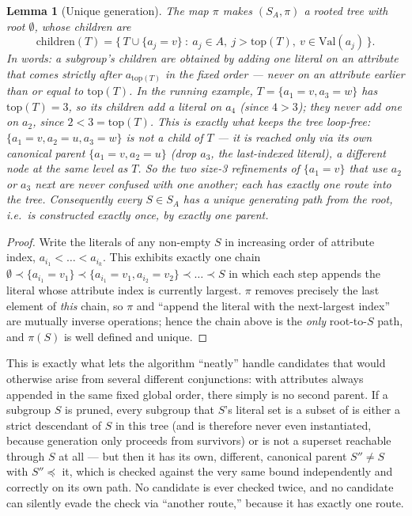 \documentclass[11pt]{article}
\newtheorem{lemma}{Lemma}
\begin{document}
\begin{lemma}[Unique generation]\label{lem:tree}
The map $\pi$ makes $(S_A,\pi)$ a rooted tree with root $\emptyset$, whose children are
\[
\mathrm{children}(T)=\bigl\{\,T\cup\{a_j\!=\!v\}\ :\ a_j\in A,\ j>\mathrm{top}(T),\ v\in\mathrm{Val}(a_j)\,\bigr\}.
\]
In words: a subgroup's children are obtained by adding one literal on an attribute
that comes \emph{strictly after} $a_{\mathrm{top}(T)}$ in the fixed order — never on
an attribute earlier than or equal to $\mathrm{top}(T)$. In the running example,
$T=\{a_1\!=\!v,a_3\!=\!w\}$ has $\mathrm{top}(T)=3$, so its children add a literal on
$a_4$ (since $4>3$); they never add one on $a_2$, since $2<3=\mathrm{top}(T)$. This is
exactly what keeps the tree loop-free: $\{a_1\!=\!v,a_2\!=\!u,a_3\!=\!w\}$ is
\emph{not} a child of $T$ — it is reached only via its own canonical parent
$\{a_1\!=\!v,a_2\!=\!u\}$ (drop $a_3$, the last-indexed literal), a different node at
the same level as $T$. So the two size-3 refinements of $\{a_1{=}v\}$ that use $a_2$
or $a_3$ next are never confused with one another; each has exactly one route into the
tree. Consequently every $S\in S_A$ has a unique generating path from the root, i.e.\
is constructed exactly once, by exactly one parent.
\end{lemma}
\begin{proof}
Write the literals of any non-empty $S$ in increasing order of attribute index,
$a_{i_1}<\dots<a_{i_k}$. This exhibits exactly one chain
$\emptyset\prec\{a_{i_1}\!=\!v_1\}\prec\{a_{i_1}\!=\!v_1,a_{i_2}\!=\!v_2\}\prec\dots\prec S$
in which each step appends the literal whose attribute index is currently largest.
$\pi$ removes precisely the last element of \emph{this} chain, so $\pi$ and ``append
the literal with the next-largest index'' are mutually inverse operations; hence the
chain above is the \emph{only} root-to-$S$ path, and $\pi(S)$ is well defined and
unique.
\end{proof}

This is exactly what lets the algorithm ``neatly'' handle candidates that would
otherwise arise from several different conjunctions: with attributes always appended
in the same fixed global order, there simply is no second parent. If a subgroup $S$ is
pruned, every subgroup that $S$'s literal set is a subset of is either a strict
descendant of $S$ in this tree (and is therefore never even instantiated, because
generation only proceeds from survivors) or is not a superset reachable through $S$ at
all — but then it has its own, different, canonical parent $S''\ne S$ with
$S''\preceq$ it, which is checked against the very same bound independently and
correctly on its own path. No candidate is ever checked twice, and no candidate can
silently evade the check via ``another route,'' because it has exactly one route.
\end{document}
